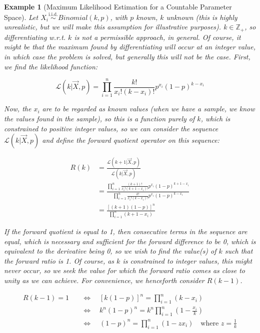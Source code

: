 \documentclass[12pt,a4paper]{article}
\newtheorem{ex}[thm]{Example}
\begin{document}
\begin{ex}[Maximum Likelihood Estimation for a Countable Parameter Space]\vspace{1cm}

Let $X_i \overset{\text{i.i.d.}}{\sim} Binomial(k,p)$, with $p$ known, $k$ unknown (this is highly unrealistic, but we will make this assumption for illustrative purposes). $k \in \mathbb{Z}_+$, so differentiating w.r.t. $k$ is not a permissible approach, in general. Of course, it might be that the maximum found by differentiating will occur at an integer value, in which case the problem is solved, but generally this will not be the case. First, we find the likelihood function:

$$\mathcal{L}(k | \vec{X},p) = \prod_{i=1}^n \frac{k!}{x_i! (k - x_i)!} p^{x_i} (1-p)^{k-x_i}$$

Now, the $x_i$ are to be regarded as known values (when we have a sample, we know the values found in the sample), so this is a function purely of $k$, which is constrained to positive integer values, so we can consider the sequence $\mathcal{L}(k | \vec{X},p)$ and define the forward quotient operator on this sequence:

\begin{align*}
R(k) &= \frac{\mathcal{L}(k+1 | \vec{X},p)}{\mathcal{L}(k | \vec{X},p)}\\
&= \frac{\prod\limits_{i=1}^n \frac{(k+1)!}{x_i! (k+1-x_i)!} p^{x_i} (1-p)^{k+1-x_i}}{\prod\limits_{i=1}^n \frac{k!}{x_i!(k-x_i)!} p^{x_i}(1-p)^{k-x_i}}\\
&= \frac{[(k+1)(1-p)]^n}{\prod\limits_{i=1}^n (k+1-x_i)}
\end{align*}

If the forward quotient is equal to 1, then consecutive terms in the sequence are equal, which is necessary and sufficient for the forward difference to be 0, which is equivalent to the derivative being 0, so we wish to find the value(s) of $k$ such that the forward ratio is 1. Of course, as $k$ is constrained to integer values, this might never occur, so we seek the value for which the forward ratio comes as close to unity as we can achieve. For convenience, we henceforth consider $R(k-1)$.

\begin{align*}
R(k-1) = 1 \quad&\Leftrightarrow\quad [k(1-p)]^n = \prod_{i=1}^n (k-x_i)\\
&\Leftrightarrow\quad k^n(1-p)^n = k^n \prod_{i=1}^n \left(1 - \frac{x_i}{k}\right)\\
&\Leftrightarrow\quad (1-p)^n = \prod_{i=1}^n (1-zx_i)\quad \textrm{where } z = \frac{1}{k}
\end{align*}


\end{ex}
\end{document}
